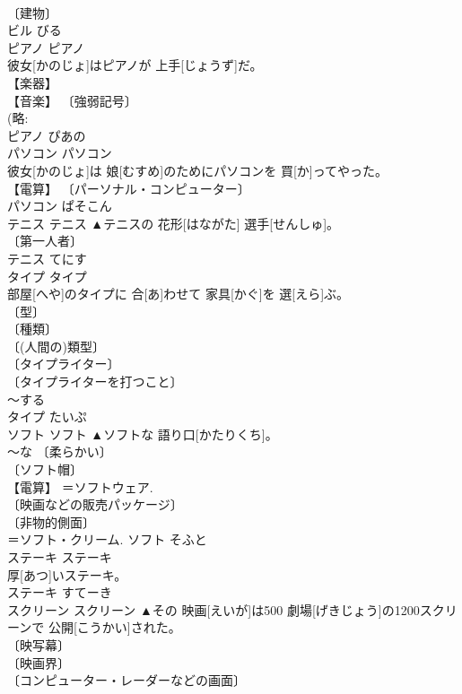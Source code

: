 \documentclass[8pt]{extreport}
\begin{document}
\begin{CJK}{UTF8}{min}
\\	〔建物〕 
\\	ビル	びる	
\\	ピアノ	ピアノ	
\\	彼女[かのじょ]はピアノが 上手[じょうず]だ。	
\\	【楽器】 
\\	【音楽】 〔強弱記号〕 
\\	(略: 
\\	ピアノ	ぴあの	
\\	パソコン	パソコン	
\\	彼女[かのじょ]は 娘[むすめ]のためにパソコンを 買[か]ってやった。	
\\	【電算】 〔パーソナル・コンピューター〕 
\\	パソコン	ぱそこん	
\\	テニス	テニス	▲テニスの 花形[はながた] 選手[せんしゅ]。	
\\	〔第一人者〕 
\\	テニス	てにす	
\\	タイプ	タイプ	
\\	部屋[へや]のタイプに 合[あ]わせて 家具[かぐ]を 選[えら]ぶ。	
\\	〔型〕 
\\	〔種類〕 
\\	〔(人間の)類型〕 
\\	〔タイプライター〕 
\\	〔タイプライターを打つこと〕 
\\	～する 
\\	タイプ	たいぷ	
\\	ソフト	ソフト	▲ソフトな 語り口[かたりくち]。	
\\	～な 〔柔らかい〕 
\\	〔ソフト帽〕 
\\	【電算】 ＝ソフトウェア. 
\\	〔映画などの販売パッケージ〕 
\\	〔非物的側面〕 
\\	＝ソフト・クリーム.	ソフト	そふと	
\\	ステーキ	ステーキ	
\\	厚[あつ]いステーキ。	
\\	ステーキ	すてーき	
\\	スクリーン	スクリーン	▲その 映画[えいが]は500 劇場[げきじょう]の1200スクリーンで 公開[こうかい]された。	
\\	〔映写幕〕 
\\	〔映画界〕 
\\	〔コンピューター・レーダーなどの画面〕 

\end{CJK}
\end{document}
